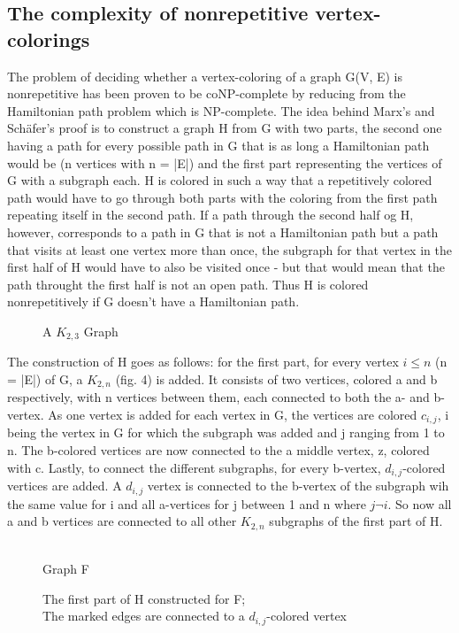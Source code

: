 \documentclass[12pt,a4paper]{article}
\begin{document}
\subsection{The complexity of nonrepetitive vertex-colorings}
The problem of deciding whether a vertex-coloring of a graph G(V, E) is nonrepetitive has been proven to be coNP-complete by reducing from the Hamiltonian path problem which is NP-complete. The idea behind Marx's and Schäfer's proof \citep{Marx2009a} is to construct a graph H from G with two parts, the second one having a path for every possible path in G that is as long a Hamiltonian path would be (n vertices with n = |E|) and the first part representing the vertices of G with a subgraph each. H is colored in such a way that a repetitively colored path would have to go through both parts with the coloring from the first path repeating itself in the second path. If a path through the second half og H, however, corresponds to a path in G that is not a Hamiltonian path but a path that visits at least one vertex more than once, the subgraph for that vertex in the first half of H would have to also be visited once - but that would mean that the path throught the first half is not an open path. Thus H is colored nonrepetitively if G doesn't have a Hamiltonian path.
\newline
\begin{wrapfigure}[5]{l}{3cm}
	
	\caption{A $K_{2,3}$ Graph}
\end{wrapfigure}
The construction of H goes as follows: for the first part, for every vertex $i \leq n$ (n = |E|) of G, a $K_{2, n}$ (fig. 4) is added. It consists of two vertices, colored a and b respectively, with n vertices between them, each connected to both the a- and b-vertex. As one vertex is added for each vertex in G, the vertices are colored $c_{i,j}$, i being the vertex in G for which the subgraph was added and j ranging from 1 to n. The b-colored vertices are now connected to the a middle vertex, z, colored with c. Lastly, to connect the different subgraphs, for every b-vertex, $d_{i,j}$-colored vertices are added. A $d_{i, j}$ vertex is connected to the b-vertex of the subgraph wih the same value for i and all a-vertices for j between 1 and n where $j \neg i$.  So now all a and b vertices are connected to all other $K_{2,n}$ subgraphs of the first part of H.
\newline
\begin{figure}[h]
\begin{minipage}{0.2\linewidth}
	
	\caption{\\Graph F}
\end{minipage}
\begin{minipage}{0.8\linewidth}
	
	\caption{The first part of H constructed for F; \\The marked edges are connected to a $d_{i,j}$-colored vertex}
\end{minipage}
\end{figure}
\end{document}
